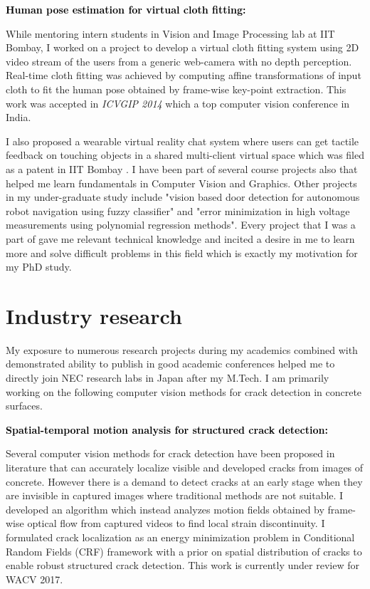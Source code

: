\documentclass{article}
\newcommand{\statement}[1]{\par\medskip
	{\textcolor{black}{\textbf{#1:}}}\space
}
\begin{document}
	\statement{Human pose estimation for virtual cloth fitting}
	 While mentoring intern students in Vision and Image Processing lab at IIT Bombay, I worked on a project to develop a  virtual cloth fitting system using 2D video stream of the users from a generic web-camera with no depth perception. Real-time cloth fitting was achieved by computing affine transformations of input cloth to fit the human pose obtained by frame-wise key-point extraction. This work was accepted in \textit{ICVGIP 2014} which a top computer vision conference in India.
	
	\vspace{0.1cm}
	 I also proposed a wearable virtual reality chat system where users can get tactile feedback on touching objects in a shared multi-client virtual space which was filed as a patent in IIT Bombay . I have been part of several course projects also that helped me learn fundamentals in Computer Vision and Graphics. Other projects in my under-graduate study include "vision based door detection for autonomous robot navigation using fuzzy classifier" and "error minimization in high voltage measurements using polynomial regression methods". Every project that I was a part of gave me relevant technical knowledge and incited a desire in me to learn more and solve difficult problems in this field which is exactly my motivation for my PhD study.

	\vspace*{-0.25cm}
	\section{Industry research}
	\vspace*{-0.25cm}
	My exposure to numerous research projects during my academics combined with demonstrated ability to publish in good academic conferences helped me to directly join NEC research labs in Japan after my M.Tech. I am primarily working on the following computer vision methods for crack detection in concrete surfaces.
	
	\statement{Spatial-temporal motion analysis for structured crack detection}
	Several computer vision methods for crack detection have been proposed in literature that can accurately localize visible and developed cracks from images of concrete. However there is a demand to detect cracks at an early stage when they are invisible in captured images where traditional methods are not suitable. I developed an algorithm which instead analyzes motion fields obtained by frame-wise optical flow from captured videos to find local strain discontinuity. I formulated crack localization as an energy minimization problem in Conditional Random Fields (CRF) framework with a prior on spatial distribution of cracks to enable robust structured crack detection. This work is currently under review for WACV 2017. 
	
\end{document}
